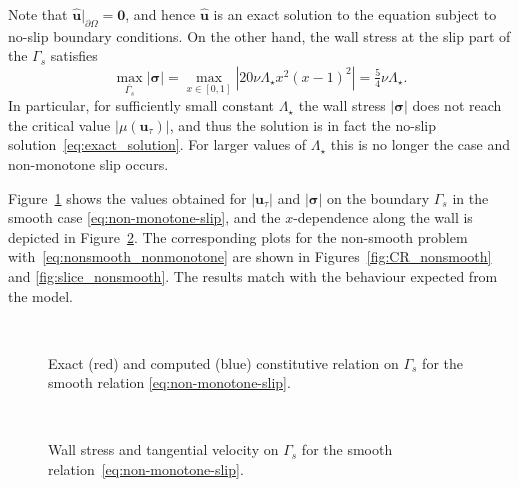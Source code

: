 \documentclass[reqno,a4paper]{amsart}
\def\abs#1{\left| #1 \right|}
\def\vec#1{\boldsymbol{#1}}
\def\bu{\vec{u}}
\def\bsigma{\vec{\sigma}}
\begin{document}
	Note that $\hat{\bu}|_{\partial\Omega}=\bm{0}$, and hence $\hat{\bu}$ is an exact solution to the equation subject to no-slip boundary conditions.
	On the other hand, the wall stress at the slip part of the $\Gamma_s$ satisfies 
	\begin{equation}
		\max_{\overline{\Gamma_s}} |\bsigma| = \max_{x\in [0,1]}|20\nu \Lambda_\star x^2(x-1)^2|
		= \tfrac{5}{4} \nu \Lambda_\star.
	\end{equation}
	In particular, for sufficiently small constant $\Lambda_\star$ the wall stress $|\bsigma|$  does not reach the
	critical value $|\mu(\bu_\tau)|$, and thus the solution is in fact the no-slip solution~\eqref{eq:exact_solution}. 
	For larger values of $\Lambda_\star$ 
	this is no longer the case and non-monotone slip occurs. 
	\medskip 
	
	Figure~\ref{fig:CR_smooth} shows the values obtained for $\abs{\bu_\tau}$ and $\abs{\bsigma}$ on the boundary $\Gamma_s$ in the smooth case \eqref{eq:non-monotone-slip}, and the $x$-dependence along the wall is depicted in Figure~\ref{fig:slice_smooth}. 
	The corresponding plots for the non-smooth problem with~\eqref{eq:nonsmooth_nonmonotone} are shown in Figures~\ref{fig:CR_nonsmooth} and \ref{fig:slice_nonsmooth}. The results match with the behaviour expected from the model.
	
	\begin{figure}
		\centering
		\\
		\caption{Exact (red) and computed (blue) constitutive relation on $\Gamma_s$ for the smooth relation \eqref{eq:non-monotone-slip}.}%
		\label{fig:CR_smooth}
	\end{figure}
	
	\begin{figure}
		\centering
		\\
		\caption{Wall stress and tangential velocity on $\Gamma_s$ for the smooth relation~\eqref{eq:non-monotone-slip}.}%
		\label{fig:slice_smooth}
	\end{figure}
	
\end{document}
